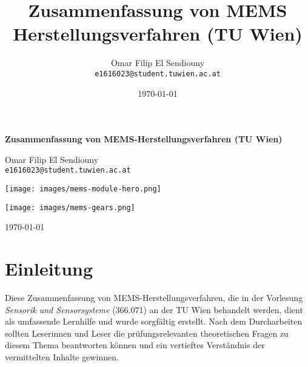 \documentclass{article} %
\title{Zusammenfassung von MEMS Herstellungsverfahren (TU Wien)}
\author{Omar Filip El Sendiouny \\ \texttt{e1616023@student.tuwien.ac.at}}
\date{\today}
\begin{document}
\begin{titlepage}
    \centering
    \vspace{2cm}
    {\Huge \bfseries Zusammenfassung von MEMS-Herstellungsverfahren (TU Wien) \par}
    
    \vspace{1cm}
    {\Large Omar Filip El Sendiouny \\ \texttt{e1616023@student.tuwien.ac.at} \par}

    \vspace*{2cm}

    \texttt{[image: images/mems-module-hero.png]}
    
    \texttt{[image: images/mems-gears.png]} 

    \vspace*{2cm} 
    
    \vfill
    
    {\large \today \par}
\end{titlepage}

\tableofcontents
\thispagestyle{empty}
\listoftables
\thispagestyle{empty}
\listoffigures
\thispagestyle{empty}
\newpage






\section*{Einleitung}

Diese Zusammenfassung von MEMS-Herstellungsverfahren, die in der Vorlesung \textit{Sensorik und Sensorsysteme} (366.071) an der TU Wien behandelt werden, dient als umfassende Lernhilfe und wurde sorgfältig erstellt. Nach dem Durcharbeiten sollten Leserinnen und Leser die prüfungsrelevanten theoretischen Fragen zu diesem Thema beantworten können und ein vertieftes Verständnis der vermittelten Inhalte gewinnen.

\vspace{1em}
\end{document}
